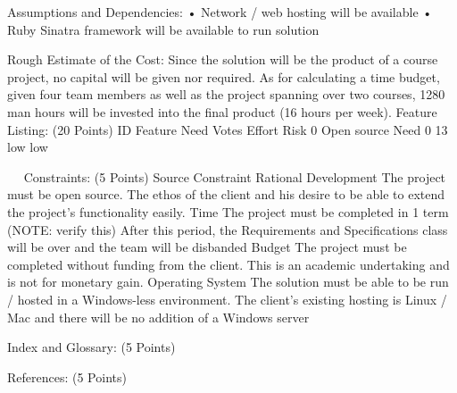 \documentclass{article}
\begin{document}
	

	Assumptions and Dependencies:
•	Network / web hosting will be available
•	Ruby Sinatra framework will be available to run solution

	Rough Estimate of the Cost:
Since the solution will be the product of a course project, no capital will be given nor required.  As for calculating a time budget, given four team members as well as the project spanning over two courses, 1280 man hours will be invested into the final product (16 hours per week).
Feature Listing: (20 Points)
ID	Feature	Need	Votes	Effort	Risk
0	Open source	Need 0	13	low	low
					
					
					
					
					
					


 
Constraints: (5 Points)
Source	Constraint	Rational
Development	The project must be open source.	The ethos of the client and his desire to be able to extend the project’s functionality easily.
Time	The project must be completed in 1 term (NOTE: verify this)	After this period, the Requirements and Specifications class will be over and the team will be disbanded
Budget	The project must be completed without funding from the client.	This is an academic undertaking and is not for monetary gain.
Operating System	The solution must be able to be run / hosted in a Windows-less environment.	The client’s existing hosting is Linux / Mac and there will be no addition of a Windows server
		
		
		


Index and Glossary: (5 Points)

References: (5 Points)
\end{document}
